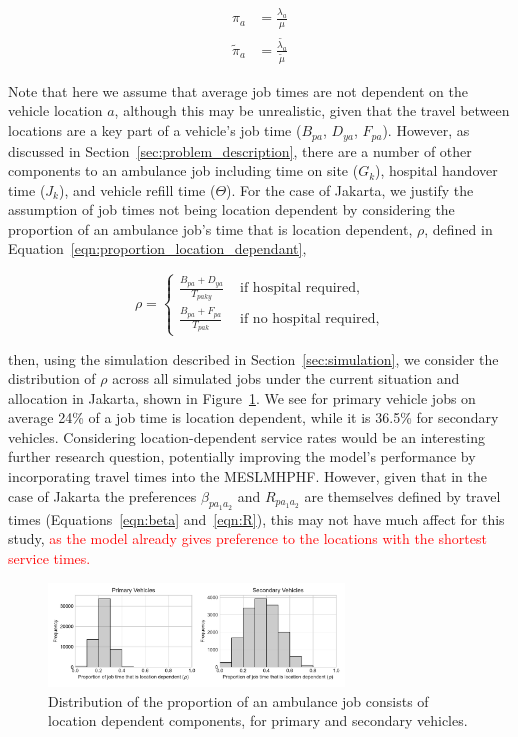 \documentclass[numbers,webpdf,imaman]{ima-authoring-template}%
\begin{document}
\begin{align}
\pi_a &= \frac{\lambda_a}{\mu} \label{eqn:utilisation_ratio_primary}\\
\tilde{\pi}_a &= \frac{\tilde{\lambda_a}}{\tilde{\mu}} \label{eqn:utilisation_ratio_secondary}
\end{align}

Note that here we assume that average job times are not dependent on the vehicle
location $a$, although this may be unrealistic, given that the travel between
locations are a key part of a vehicle's job time ($B_{pa}$, $D_{ya}$, $F_{pa}$).
However, as discussed in Section~\ref{sec:problem_description}, there are a
number of other components to an ambulance job including time on site ($G_k$),
hospital handover time ($J_k$), and vehicle refill time ($\Theta$). For the
case of Jakarta, we justify the assumption of job times not being location
dependent by considering the proportion of an ambulance job's time that is
location dependent, $\rho$, defined in
Equation~\ref{eqn:proportion_location_dependant},

\begin{equation}\label{eqn:proportion_location_dependant}
\rho = \begin{cases}
  \frac{B_{pa} + D_{ya}}{T_{paky}} & \text{ if hospital required,} \\[8pt]
  \frac{B_{pa} + F_{pa}}{T_{pak}} & \text{ if no hospital required,}
\end{cases}
\end{equation}

\noindent
then, using the simulation described in Section~\ref{sec:simulation}, we
consider the distribution of $\rho$ across all simulated jobs under the current
situation and allocation in Jakarta, shown in Figure~\ref{fig:rho_distribution}.
We see for primary vehicle jobs on average 24\% of a job time is location
dependent, while it is 36.5\% for secondary vehicles. Considering
location-dependent service rates would be an interesting further research
question, potentially improving the model's performance by incorporating travel
times into the MESLMHPHF. However, given that in the case of Jakarta the
preferences $\beta_{p a_1 a_2}$ and $R_{p a_1 a_2}$ are themselves defined by
travel times (Equations~\ref{eqn:beta} and~\ref{eqn:R}), this may not have much
affect for this study, \textcolor{red}{as the model already gives preference to
the locations with the shortest service times.}

\begin{figure}
    \centering
    \includegraphics[width=0.7\textwidth]{img/location_dependant_service_time_proportion}
    \caption{Distribution of the proportion of an ambulance job consists of
    location dependent components, for primary and secondary vehicles.}
    \label{fig:rho_distribution}
\end{figure}
\end{document}

